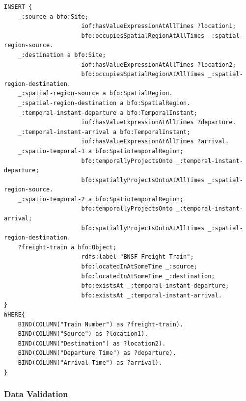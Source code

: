 \begin{verbatim}
INSERT {
    _:source a bfo:Site; 
                      iof:hasValueExpressionAtAllTimes ?location1; 
                      bfo:occupiesSpatialRegionAtAllTimes _:spatial-region-source.
    _:destination a bfo:Site; 
                      iof:hasValueExpressionAtAllTimes ?location2; 
                      bfo:occupiesSpatialRegionAtAllTimes _:spatial-region-destination.
    _:spatial-region-source a bfo:SpatialRegion.
    _:spatial-region-destination a bfo:SpatialRegion.
    _:temporal-instant-departure a bfo:TemporalInstant;
                      iof:hasValueExpressionAtAllTimes ?departure.
    _:temporal-instant-arrival a bfo:TemporalInstant;
                      iof:hasValueExpressionAtAllTimes ?arrival.
    _:spatio-temporal-1 a bfo:SpatioTemporalRegion;
                      bfo:temporallyProjectsOnto _:temporal-instant-departure;
                      bfo:spatiallyProjectsOntoAtAllTimes _:spatial-region-source. 
    _:spatio-temporal-2 a bfo:SpatioTemporalRegion;
                      bfo:temporallyProjectsOnto _:temporal-instant-arrival;
                      bfo:spatiallyProjectsOntoAtAllTimes _:spatial-region-destination.
    ?freight-train a bfo:Object;
                      rdfs:label "BNSF Freight Train";   
                      bfo:locatedInAtSomeTime _:source;
                      bfo:locatedInAtSomeTime _:destination;
                      bfo:existsAt _:temporal-instant-departure;
                      bfo:existsAt _:temporal-instant-arrival.              
}
WHERE{
    BIND(COLUMN("Train Number") as ?freight-train).
    BIND(COLUMN("Source") as ?location1).
    BIND(COLUMN("Destination") as ?location2).
    BIND(COLUMN("Departure Time") as ?departure).
    BIND(COLUMN("Arrival Time") as ?arrival).
}
\end{verbatim}

\subsubsection*{Data Validation}

